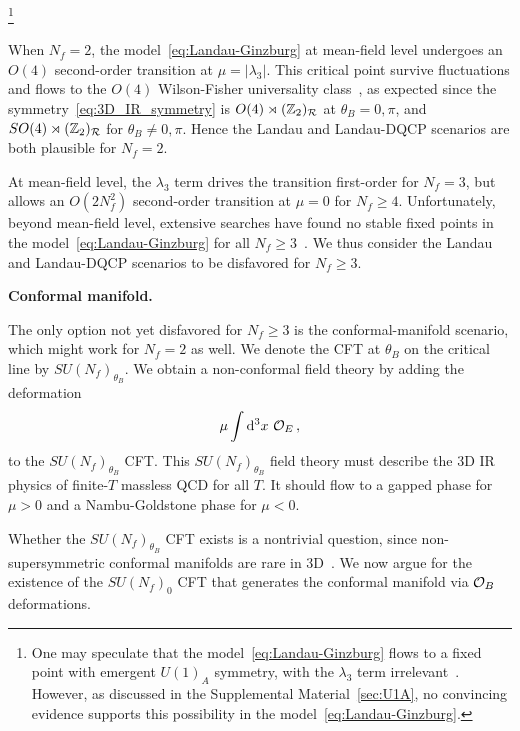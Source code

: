 \documentclass[
 reprint,







nofootinbib,


 amsmath,amssymb,
 aps,
 prd






tightenlines
]{revtex4-2}
\begin{document}
\footnote{One may speculate that the model~\eqref{eq:Landau-Ginzburg} flows to a fixed point with emergent $U(1)_A$ symmetry, with the $\lambda_3$ term irrelevant~\cite{Pisarski:1983ms,Cohen:1996ng,Lee:1996zy,Cohen:2002st,Fukushima:2008wg,Aoki:2012yj,Pelissetto:2013hqa,Cossu:2013uua}.
However, as discussed in the Supplemental Material~\ref{sec:U1A}, no convincing evidence supports this possibility in the model~\eqref{eq:Landau-Ginzburg}.
}


When $N_f=2$, the model~\eqref{eq:Landau-Ginzburg} at mean-field level undergoes an $O(4)$ second-order transition
at $\mu=|\lambda_3|$.
This critical point survive fluctuations and flows to the $O(4)$ Wilson-Fisher universality class~\cite{Pisarski:1983ms,Butti:2003nu}, as expected since the symmetry~\eqref{eq:3D_IR_symmetry} is $O(4)\rtimes(\mathbb{Z}_2)_{\mathcal{R}}$ at $\theta_B=0,\pi$, and $SO(4)\rtimes(\mathbb{Z}_2)_{\mathcal{R}}$ for $\theta_B\neq0,\pi$.
Hence the Landau and Landau-DQCP scenarios are both plausible for $N_f=2$.

At mean-field level, the $\lambda_3$ term drives the transition first-order for $N_f=3$, but allows an $O(2N_f^2)$ second-order transition at $\mu=0$ for $N_f\ge4$.
Unfortunately, beyond mean-field level, extensive searches have found no stable fixed points in the model~\eqref{eq:Landau-Ginzburg} for all $N_f\ge 3$~\cite{Pisarski:1983ms,Butti:2003nu,Calabrese:2004uk,Adzhemyan:2021sug,Fejos:2014qga,Resch:2017vjs,Fejos:2022mso,Fejos:2024bgl}.
We thus consider the Landau and Landau-DQCP scenarios to be disfavored for $N_f\geq 3$.




{\bf Conformal manifold.}


The only option not yet disfavored for $N_f\ge3$ is the
conformal-manifold scenario, which might work for $N_f=2$ as well. We
denote the CFT at $\theta_B$ on the critical line by
$SU(N_f)_{\theta_B}$. We obtain a non-conformal field theory by adding
the deformation
\begin{equation}
   \mu \int\mathrm{d}^3x\ \mathcal{O}_E\,,
\end{equation}
to the $SU(N_f)_{\theta_{B}}$ CFT. This $SU(N_f)_{\theta_B}$ field theory must
describe the 3D IR physics of finite-$T$ massless QCD for all $T$. It should
flow to a gapped phase for $\mu>0$ and a Nambu-Goldstone
phase for $\mu<0$.

Whether the $SU(N_f)_{\theta_B}$ CFT exists is a nontrivial question, since
non-supersymmetric conformal manifolds are rare in
3D~\cite{Gaberdiel:2008fn,Bashmakov:2017rko,Behan:2017mwi,Hollands:2017chb,Sen:2017gfr,Giambrone:2021wsm}.
We now argue for the existence of the $SU(N_f)_0$ CFT that generates the
conformal manifold via $\mathcal{O}_B$ deformations.
\end{document}
